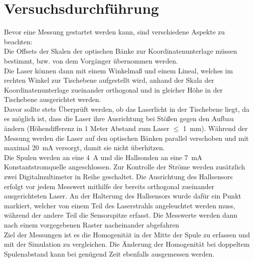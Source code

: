\documentclass[12pt,a4paper]{article}
\begin{document}
\section{Versuchsdurchführung}
Bevor eine Messung gestartet werden kann, sind verschiedene Aspekte zu beachten:\\
Die Offsets der Skalen der optischen Bänke zur Koordinatenunterlage müssen bestimmt, bzw. von dem Vorgänger übernommen werden.\\ Die Laser können dann mit einem Winkelmaß und einem Lineal, welches im rechten Winkel zur Tischebene aufgestellt wird, anhand der Skala der Koordinatenunterlage zueinander orthogonal und in gleicher Höhe in der Tischebene ausgerichtet werden.\\ Davor sollte stets Überprüft werden, ob das Laserlicht in der Tischebene liegt, da es möglich ist, dass die Laser ihre Ausrichtung bei Stößen gegen den Aufbau ändern (Höhendifferenz in 1 Meter Abstand zum Laser $\leq$ \SI{1}{\milli \meter}). Während der Messung werden die Laser auf den optischen Bänken parallel verschoben und mit maximal \SI{20}{\milli \ampere} versorgt, damit sie nicht überhitzen.\\ Die Spulen werden an eine \SI{4}{\ampere} und die Hallsonden an eine \SI{7}{\milli \ampere} Konstantstromquelle angeschlossen. Zur Kontrolle der Ströme werden zusätzlich zwei Digitalmultimeter in Reihe geschaltet. Die Ausrichtung des Hallsensors erfolgt vor jedem Messwert mithilfe der bereits orthogonal zueinander ausgerichteten Laser. An der Halterung des Hallsensors wurde dafür ein Punkt markiert, welcher von einem Teil des Laserstrahls angeleuchtet werden muss, während der andere Teil die Sensorspitze erfasst. Die Messwerte werden dann nach einem vorgegebenen Raster nacheinander abgefahren\\ Ziel der Messungen ist es die Homogenität in der Mitte der Spule zu erfassen und mit der Simulation zu vergleichen. Die Änderung der Homogenität bei doppeltem Spulenabstand kann bei genügend Zeit ebenfalls ausgemessen werden. 
\end{document}
